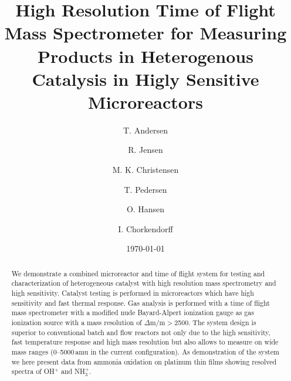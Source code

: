 \documentclass[aip,rsi]{revtex4-1}
\begin{document}

\title{High Resolution Time of Flight Mass Spectrometer for Measuring Products in Heterogenous Catalysis in Higly Sensitive Microreactors} %



\author{T. Andersen}
\author{R. Jensen}
\author{M. K. Christensen}
\author{T. Pedersen}
\author{O. Hansen}
\author{I. Chorkendorff}


\date{\today}

\begin{abstract}
We demonstrate a combined microreactor and time of flight system for testing and characterization of heterogeneous catalyst with high resolution mass spectrometry and high sensitivity. Catalyst testing is performed in microreactors which have high sensitivity and fast thermal response. Gas analysis is performed with a time of flight mass spectrometer with a modified nude Bayard-Alpert ionization gauge as gas ionization source with a mass resolution of $\Delta$m/m$>$2500. The system design is superior to conventional batch and flow reactors not only due to the high sensitivity, fast temperature response and high mass resolution but also allows to measure on wide mass ranges (0--5000\,amu in the current configuration). As demonstration of the system we here present data from ammonia oxidation on platinum thin films showing resolved spectra of OH$^{+}$ and NH$_{3}^{+}$.
\end{abstract}
\end{document}
